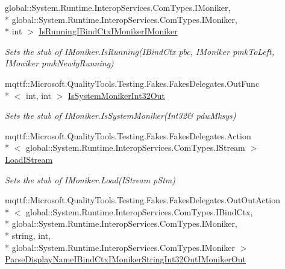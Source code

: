 \begin{DoxyCompactItemize}
global\-::\-System.\-Runtime.\-Interop\-Services.\-Com\-Types.\-I\-Moniker, \\*
global\-::\-System.\-Runtime.\-Interop\-Services.\-Com\-Types.\-I\-Moniker, \\*
int $>$ \hyperlink{class_system_1_1_runtime_1_1_interop_services_1_1_com_types_1_1_fakes_1_1_stub_i_moniker_a84346bebe87d567a8b20e3d2947a4720}{Is\-Running\-I\-Bind\-Ctx\-I\-Moniker\-I\-Moniker}
\begin{DoxyCompactList}\small\item\em Sets the stub of I\-Moniker.\-Is\-Running(\-I\-Bind\-Ctx pbc, I\-Moniker pmk\-To\-Left, I\-Moniker pmk\-Newly\-Running)\end{DoxyCompactList}\item 
mqttf\-::\-Microsoft.\-Quality\-Tools.\-Testing.\-Fakes.\-Fakes\-Delegates.\-Out\-Func\\*
$<$ int, int $>$ \hyperlink{class_system_1_1_runtime_1_1_interop_services_1_1_com_types_1_1_fakes_1_1_stub_i_moniker_a8f6296dd3045af66a3356b60af53dfea}{Is\-System\-Moniker\-Int32\-Out}
\begin{DoxyCompactList}\small\item\em Sets the stub of I\-Moniker.\-Is\-System\-Moniker(Int32\& pdw\-Mksys)\end{DoxyCompactList}\item 
mqttf\-::\-Microsoft.\-Quality\-Tools.\-Testing.\-Fakes.\-Fakes\-Delegates.\-Action\\*
$<$ global\-::\-System.\-Runtime.\-Interop\-Services.\-Com\-Types.\-I\-Stream $>$ \hyperlink{class_system_1_1_runtime_1_1_interop_services_1_1_com_types_1_1_fakes_1_1_stub_i_moniker_aa4bbfdfc71a565b04b632e0ddfe44414}{Load\-I\-Stream}
\begin{DoxyCompactList}\small\item\em Sets the stub of I\-Moniker.\-Load(\-I\-Stream p\-Stm)\end{DoxyCompactList}\item 
mqttf\-::\-Microsoft.\-Quality\-Tools.\-Testing.\-Fakes.\-Fakes\-Delegates.\-Out\-Out\-Action\\*
$<$ global\-::\-System.\-Runtime.\-Interop\-Services.\-Com\-Types.\-I\-Bind\-Ctx, \\*
global\-::\-System.\-Runtime.\-Interop\-Services.\-Com\-Types.\-I\-Moniker, \\*
string, int, \\*
global\-::\-System.\-Runtime.\-Interop\-Services.\-Com\-Types.\-I\-Moniker $>$ \hyperlink{class_system_1_1_runtime_1_1_interop_services_1_1_com_types_1_1_fakes_1_1_stub_i_moniker_a4585b5ed6d1e7e9e71c9554c1cc75116}{Parse\-Display\-Name\-I\-Bind\-Ctx\-I\-Moniker\-String\-Int32\-Out\-I\-Moniker\-Out}

\end{DoxyCompactItemize}
